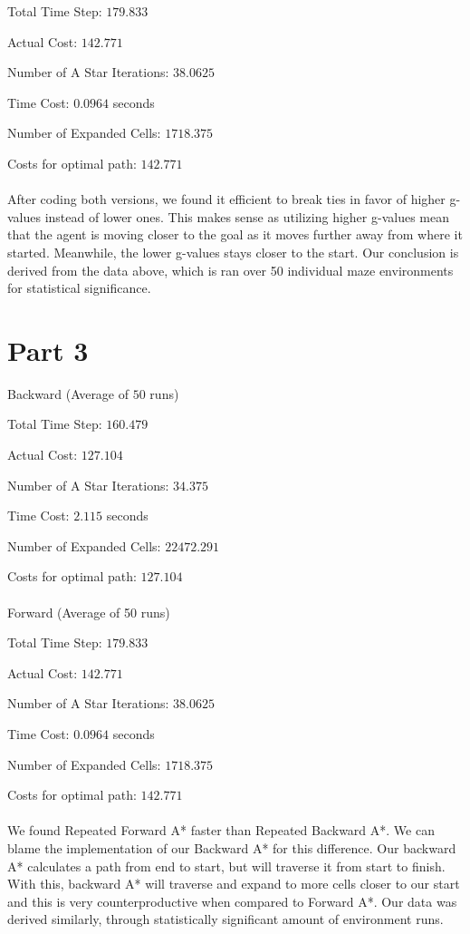 \documentclass{article}
\begin{document}
Total Time Step: $179.833$

Actual Cost: $142.771$

Number of A Star Iterations: $38.0625$

Time Cost: $0.0964$ seconds

Number of Expanded Cells: $1718.375$

Costs for optimal path: $142.771$
\\
\\After coding both versions, we found it efficient to break ties in favor of higher g-values instead of lower ones. This makes sense as utilizing higher g-values mean that the agent is moving closer to the goal as it moves further away from where it started. Meanwhile, the lower g-values stays closer to the start. Our conclusion is derived from the data above, which is ran over 50 individual maze environments for statistical significance.

\section*{Part 3}
Backward (Average of $50$ runs)

Total Time Step: $160.479$

Actual Cost: $127.104$

Number of A Star Iterations: $34.375$

Time Cost: $2.115$ seconds

Number of Expanded Cells: $22472.291$

Costs for optimal path: $127.104$
\\
\\Forward (Average of 50 runs)

Total Time Step: $179.833$

Actual Cost: $142.771$

Number of A Star Iterations: $38.0625$

Time Cost: $0.0964$ seconds

Number of Expanded Cells: $1718.375$

Costs for optimal path: $142.771$
\\
\\We found Repeated Forward A* faster than Repeated Backward A*. We can blame the implementation of our Backward A* for this difference. Our backward A* calculates a path from end to start, but will traverse it from start to finish. With this, backward A* will traverse and expand to more cells closer to our start and this is very counterproductive when compared to Forward A*. Our data was derived similarly, through statistically significant amount of environment runs.
\end{document}
